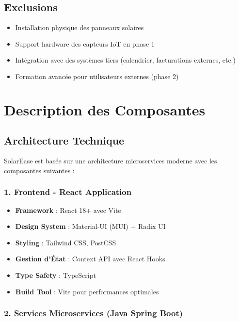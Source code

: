 \documentclass[12pt,a4paper,french]{report}
\begin{document}
\subsection{Exclusions}

\begin{itemize}
    \item Installation physique des panneaux solaires
    \item Support hardware des capteurs IoT en phase 1
    \item Intégration avec des systèmes tiers (calendrier, facturations externes, etc.)
    \item Formation avancée pour utilisateurs externes (phase 2)
\end{itemize}

\section{Description des Composantes}

\subsection{Architecture Technique}

SolarEase est basée sur une architecture microservices moderne avec les composantes suivantes :

\subsubsection{1. Frontend - React Application}

\begin{itemize}
    \item \textbf{Framework} : React 18+ avec Vite
    \item \textbf{Design System} : Material-UI (MUI) + Radix UI
    \item \textbf{Styling} : Tailwind CSS, PostCSS
    \item \textbf{Gestion d'État} : Context API avec React Hooks
    \item \textbf{Type Safety} : TypeScript
    \item \textbf{Build Tool} : Vite pour performances optimales
\end{itemize}

\subsubsection{2. Services Microservices (Java Spring Boot)}
\end{document}
